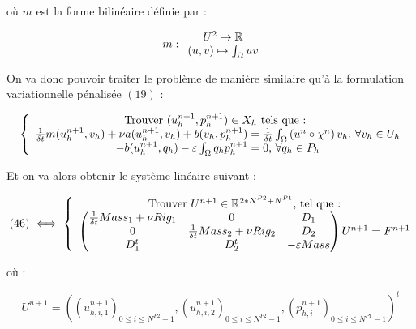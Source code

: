 \documentclass[a4paper,12pt]{article}
\begin{document}
où $m$ est la forme bilinéaire définie par :

\begin{equation}
m : \begin{array}{c @{} c}
U^2 \to \mathbb{R} \\
(u,v) \mapsto \int_\Omega u v
\end{array}
\end{equation}

On va donc pouvoir traiter le problème de manière similaire qu'à la formulation variationnelle pénalisée $(19)$ :

\begin{equation}
\left \{
\begin{array}{c @{} c}
\text{Trouver } (u_{h}^{n+1},p_{h}^{n+1}) \in X_{h} \text{ tels que : } \\
\frac{1}{\delta t} m(u_{h}^{n+1},v_h) + \nu a(u_{h}^{n+1},v_{h}) + b(v_{h},p_{h}^{n+1}) = \frac{1}{\delta t}\int_{\Omega} \left( u^n \circ \chi^n \right) v_{h} \text{, } \forall v_{h} \in U_{h} \\
-b(u_{h}^{n+1},q_{h}) - \varepsilon \int_{\Omega} q_{h} p_{h}^{n+1} = 0 \text{, } \forall q_{h} \in P_{h}\\
\end{array}
\right.
\end{equation}

Et on va alors obtenir le système linéaire suivant :

\begin{equation}
(46) \iff \left \{
\begin{array}{c @{} c}
\text{Trouver } U^{n+1} \in \mathbb{R}^{2*N^{P2}+N^{P1}} \text{, tel que :} \\
\begin{pmatrix}
\frac{1}{\delta t} Mass_{1} + \nu Rig_{1} & 0 & D_{1} \\
0 & \frac{1}{\delta t} Mass_{2} + \nu Rig_{2} & D_{2} \\
D_{1}^{t} & D_{2}^{t} & -\varepsilon Mass \\
\end{pmatrix} U^{n+1} = F^{n+1} \\
\end{array}
\right.
\end{equation}

où :

\begin{equation}
U^{n+1} = \left( (u_{h,i,1}^{n+1})_{0 \leq i \leq N^{P2}-1}, (u_{h,i,2}^{n+1})_{0 \leq i \leq N^{P2}-1}, (p_{h,i}^{n+1})_{0 \leq i \leq N^{P1}-1} \right)^t
\end{equation}
\end{document}
